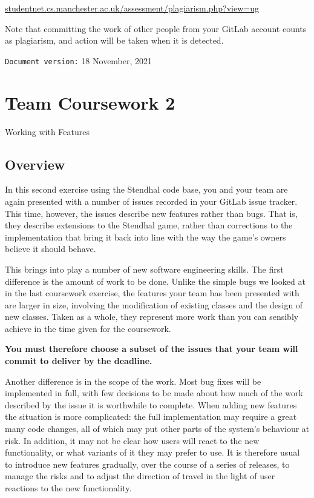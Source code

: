 \documentclass[
]{book}
\begin{document}
\href{http://studentnet.cs.manchester.ac.uk/assessment/plagiarism.php?view=ug}{studentnet.cs.manchester.ac.uk/assessment/plagiarism.php?view=ug}

Note that committing the work of other people from your GitLab account counts as plagiarism, and action will be taken when it is detected.

\texttt{Document\ version:} 18 November, 2021

\hypertarget{working}{%
\chapter{Team Coursework 2}\label{working}}

Working with Features

\hypertarget{ovirew}{%
\section{Overview}\label{ovirew}}

In this second exercise using the Stendhal code base, you and your team are again presented with a number of issues recorded in your GitLab issue tracker. This time, however, the issues describe new features rather than bugs. That is, they describe extensions to the Stendhal game, rather than corrections to the implementation that bring it back into line with the way the game's owners believe it should behave.

This brings into play a number of new software engineering skills. The first difference is the amount of work to be done. Unlike the simple bugs we looked at in the last coursework exercise, the features your team has been presented with are larger in size, involving the modification of existing classes and the design of new classes. Taken as a whole, they represent more work than you can sensibly achieve in the time given for the coursework.

\textbf{You must therefore choose a subset of the issues that your team will commit to deliver by the deadline.}

Another difference is in the scope of the work. Most bug fixes will be implemented in full, with few decisions to be made about how much of the work described by the issue it is worthwhile to complete. When adding new features the situation is more complicated: the full implementation may require a great many code changes, all of which may put other parts of the system's behaviour at risk. In addition, it may not be clear how users will react to the new functionality, or what variants of it they may prefer to use. It is therefore usual to introduce new features gradually, over the course of a series of releases, to manage the risks and to adjust the direction of travel in the light of user reactions to the new functionality.
\end{document}

